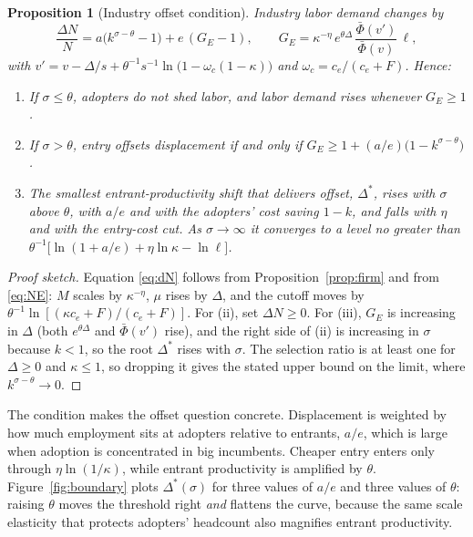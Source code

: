 \documentclass[11pt]{article}
\newtheorem{proposition}{Proposition}
\theoremstyle{remark}
\begin{document}
\begin{proposition}[Industry offset condition]\label{prop:industry}
Industry labor demand changes by
\begin{equation}\label{eq:dN}
  \frac{\Delta N}{N} = a\bigl(k^{\sigma-\theta} - 1\bigr) + e\,(G_E - 1),
  \qquad
  G_E = \kappa^{-\eta}\, e^{\theta\Delta}\, \frac{\bar\Phi(v')}{\bar\Phi(v)}\,\ell,
\end{equation}
with $v' = v - \Delta/s + \theta^{-1} s^{-1}\ln\bigl(1 - \omega_c(1-\kappa)\bigr)$ and $\omega_c = c_e/(c_e+F)$. Hence:
\begin{enumerate}
  \item[(i)] If $\sigma \le \theta$, adopters do not shed labor, and labor demand rises whenever $G_E \ge 1$.
  \item[(ii)] If $\sigma > \theta$, entry offsets displacement if and only if $G_E \ge 1 + (a/e)\bigl(1 - k^{\sigma-\theta}\bigr)$.
  \item[(iii)] The smallest entrant-productivity shift that delivers offset, $\Delta^*$, rises with $\sigma$ above $\theta$, with $a/e$ and with the adopters' cost saving $1-k$, and falls with $\eta$ and with the entry-cost cut. As $\sigma \to \infty$ it converges to a level no greater than $\theta^{-1}\bigl[\ln(1 + a/e) + \eta\ln\kappa - \ln\ell\bigr]$.
\end{enumerate}
\end{proposition}

\begin{proof}[Proof sketch]
Equation \eqref{eq:dN} follows from Proposition~\ref{prop:firm} and from \eqref{eq:NE}: $M$ scales by $\kappa^{-\eta}$, $\mu$ rises by $\Delta$, and the cutoff moves by $\theta^{-1}\ln[(\kappa c_e + F)/(c_e+F)]$. For (ii), set $\Delta N \ge 0$. For (iii), $G_E$ is increasing in $\Delta$ (both $e^{\theta\Delta}$ and $\bar\Phi(v')$ rise), and the right side of (ii) is increasing in $\sigma$ because $k < 1$, so the root $\Delta^*$ rises with $\sigma$. The selection ratio is at least one for $\Delta \ge 0$ and $\kappa \le 1$, so dropping it gives the stated upper bound on the limit, where $k^{\sigma-\theta} \to 0$.
\end{proof}

\noindent The condition makes the offset question concrete. Displacement is weighted by how much employment sits at adopters relative to entrants, $a/e$, which is large when adoption is concentrated in big incumbents. Cheaper entry enters only through $\eta\ln(1/\kappa)$, while entrant productivity is amplified by $\theta$. Figure~\ref{fig:boundary} plots $\Delta^*(\sigma)$ for three values of $a/e$ and three values of $\theta$: raising $\theta$ moves the threshold right \emph{and} flattens the curve, because the same scale elasticity that protects adopters' headcount also magnifies entrant productivity.
\end{document}
